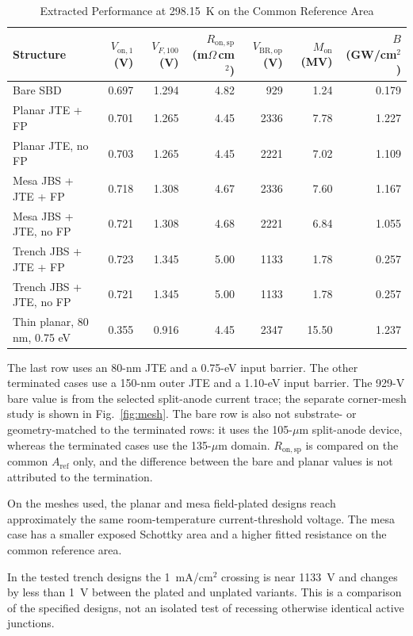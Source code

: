 \documentclass[journal,10pt]{IEEEtran}
\newcommand{\Vop}{\ensuremath{V_{\mathrm{BR,op}}}}
\newcommand{\Von}{\ensuremath{V_{\mathrm{on},1}}}
\newcommand{\Ron}{\ensuremath{R_{\mathrm{on,sp}}}}
\begin{document}
\begin{table}[!t]
\caption{Extracted Performance at 298.15~K on the Common Reference Area}
\label{tab:architectures}
\centering\footnotesize
\begin{tabular}{lrrrrrr}
\toprule
Structure & $\Von$ (V) & $V_{F,100}$ (V) & $\Ron$ (m$\Omega$\,cm$^2$) & $\Vop$ (V) & $M_{\mathrm{on}}$ (MV) & $B$ (GW/cm$^2$)\\
\midrule
Bare SBD & 0.697 & 1.294 & 4.82 & 929 & 1.24 & 0.179\\
Planar JTE + FP & 0.701 & 1.265 & 4.45 & 2336 & 7.78 & 1.227\\
Planar JTE, no FP & 0.703 & 1.265 & 4.45 & 2221 & 7.02 & 1.109\\
Mesa JBS + JTE + FP & 0.718 & 1.308 & 4.67 & 2336 & 7.60 & 1.167\\
Mesa JBS + JTE, no FP & 0.721 & 1.308 & 4.68 & 2221 & 6.84 & 1.055\\
Trench JBS + JTE + FP & 0.723 & 1.345 & 5.00 & 1133 & 1.78 & 0.257\\
Trench JBS + JTE, no FP & 0.721 & 1.345 & 5.00 & 1133 & 1.78 & 0.257\\
Thin planar, 80 nm, 0.75 eV & 0.355 & 0.916 & 4.45 & 2347 & 15.50 & 1.237\\
\bottomrule
\end{tabular}
\par\smallskip\begin{minipage}{0.96\textwidth}\footnotesize
The last row uses an 80-nm JTE and a 0.75-eV input barrier. The other terminated cases use a 150-nm outer JTE and a 1.10-eV input barrier. The 929-V bare value is from the selected split-anode current trace; the separate corner-mesh study is shown in Fig.~\ref{fig:mesh}. The bare row is also not substrate- or geometry-matched to the terminated rows: it uses the 105-$\mu$m split-anode device, whereas the terminated cases use the 135-$\mu$m domain. $R_{\mathrm{on,sp}}$ is compared on the common $A_{\mathrm{ref}}$ only, and the difference between the bare and planar values is not attributed to the termination.
\end{minipage}
\end{table}

On the meshes used, the planar and mesa field-plated designs reach approximately the same room-temperature current-threshold voltage. The mesa case has a smaller exposed Schottky area and a higher fitted resistance on the common reference area.

In the tested trench designs the 1~mA/cm$^2$ crossing is near 1133~V and changes by less than 1~V between the plated and unplated variants. This is a comparison of the specified designs, not an isolated test of recessing otherwise identical active junctions.
\end{document}
